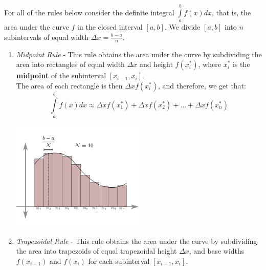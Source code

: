 \documentclass[11pt,a4paper,oneside]{report}
\begin{document}
For all of the rules below consider the definite integral $\int\limits_a^b f(x) dx$, that is, the area under the curve $f$ in the closed interval $[a, b]$. We divide $[a, b]$ into $n$ subintervals of equal width $\Delta x = \frac{b - a}{n}$. \\
\begin{enumerate}
\item \emph{Midpoint Rule } - This rule obtains the area under the curve by subdividing the area into rectangles of equal width $\Delta x$ and height $f(x^*_i)$, where $x^*_i$ is the {\bf midpoint} of the subinterval $[x_{i-1}, x_i]$. \\ 

The area of each rectangle is then  $\displaystyle\Delta x f(x^*_i)$, and therefore, we get that: \\
\[ \int\limits_a^b f(x) dx \approx \Delta x f(x^*_1) + \Delta x f(x^*_2) + ... + \Delta x f(x^*_n)\]

\begin{center}
\includegraphics[width=2.5in]{MidpointRule.png}
\end{center}
\item \emph{Trapezoidal Rule } - This rule obtains the area under the curve by subdividing the area into trapezoids of equal trapezoidal height $\Delta x$, and base widths $f(x_{i-1})$ and $f(x_i)$ for each subinterval $[x_{i-1}, x_i]$. \\ 


\end{enumerate}
\end{document}
